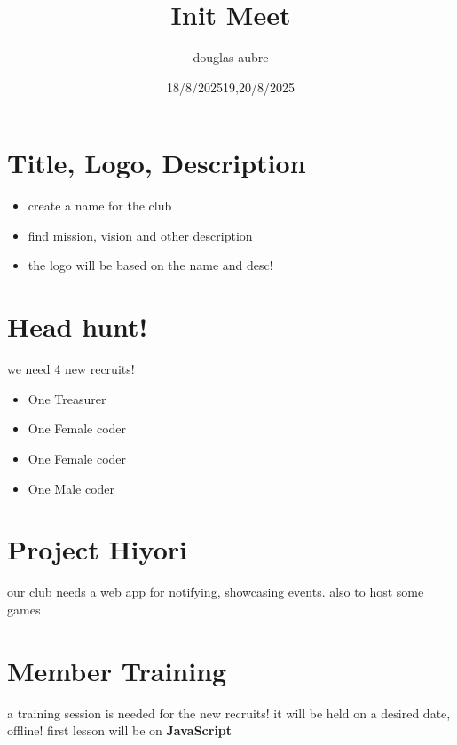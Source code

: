 \documentclass[14pt]{extarticle}
\title{\Huge Init Meet}
\author{douglas aubre}
\begin{document}
\maketitle
{}

\newpage
\tableofcontents
{}

\newpage
{}

\begin{flushleft}
    \large \date{18/8/2025}
\end{flushleft}
\section{
  Title, Logo, Description
 }
\begin{itemize}
    \item create a name for the club
    \item find mission, vision and other description
    \item the logo will be based on the name and desc!
\end{itemize}
\vfil
\section{
  Head hunt!
 }
\par{
    we need 4 new recruits!
}
\begin{itemize}
    \item One Treasurer
    \item One Female coder
    \item One Female coder
    \item One Male coder
\end{itemize}

\newpage
\flushleft\large \date{19,20/8/2025}
\section{
  Project Hiyori
 }
\parbox{\linewidth}{
    our club needs a web app for notifying,
    \newline
    showcasing events.
    \newline
    also to host some games
}
\vfil
\section{
  Member Training
 }
\parbox{\linewidth}{
    a training session is needed for the new recruits!
    \newline
    it will be held on a desired date, offline!
    \newline
    \newline
    first lesson will be on \textbf{JavaScript}
}
\end{document}
